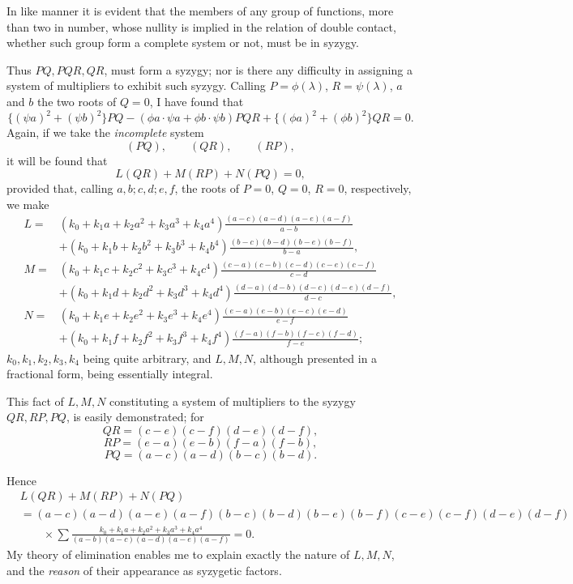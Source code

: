 \documentclass[11pt]{article}
\newcommand{\sourcepage}[1]{\marginpar{\scriptsize p.~#1}}
\begin{document}
{{In like manner it is evident that the members of any group of functions, more than two in number, whose nullity is implied in the relation of double contact, whether such group form a complete system or not, must be in syzygy.

Thus $PQ,PQR,QR$, must form a syzygy; nor is there any difficulty in assigning a system of multipliers to exhibit such syzygy. Calling $P=\phi(\lambda)$, $R=\psi(\lambda)$, $a$ and $b$ the two roots of $Q=0$, I have found that
\[
\{(\psi a)^2+(\psi b)^2\}PQ-(\phi a\cdot\psi a+\phi b\cdot\psi b)PQR+\{(\phi a)^2+(\phi b)^2\}QR=0.
\]
Again, if we take the \emph{incomplete} system
\[
(PQ),\qquad (QR),\qquad (RP),
\]
it will be found that
\[
L(QR)+M(RP)+N(PQ)=0,
\]
provided that, calling $a,b;c,d;e,f$, the roots of $P=0$, $Q=0$, $R=0$, respectively, we make
\[
\begin{aligned}
L={}&(k_0+k_1a+k_2a^2+k_3a^3+k_4a^4)
\frac{(a-c)(a-d)(a-e)(a-f)}{a-b}\\
&+(k_0+k_1b+k_2b^2+k_3b^3+k_4b^4)
\frac{(b-c)(b-d)(b-e)(b-f)}{b-a},\\
M={}&(k_0+k_1c+k_2c^2+k_3c^3+k_4c^4)
\frac{(c-a)(c-b)(c-d)(c-e)(c-f)}{c-d}\\
&+(k_0+k_1d+k_2d^2+k_3d^3+k_4d^4)
\frac{(d-a)(d-b)(d-c)(d-e)(d-f)}{d-c},\\
N={}&(k_0+k_1e+k_2e^2+k_3e^3+k_4e^4)
\frac{(e-a)(e-b)(e-c)(e-d)}{e-f}\\
&+(k_0+k_1f+k_2f^2+k_3f^3+k_4f^4)
\frac{(f-a)(f-b)(f-c)(f-d)}{f-e};
\end{aligned}
\]
$k_0,k_1,k_2,k_3,k_4$ being quite arbitrary, and $L,M,N$, although presented in a fractional form, being essentially integral.

This fact of $L,M,N$ constituting a system of multipliers to the syzygy $QR,RP,PQ$, is easily demonstrated; for
\[
QR=(c-e)(c-f)(d-e)(d-f),
\]
\[
RP=(e-a)(e-b)(f-a)(f-b),
\]
\[
PQ=(a-c)(a-d)(b-c)(b-d).
\]

\sourcepage{133}
Hence
\[
\begin{aligned}
&L(QR)+M(RP)+N(PQ)\\
&=(a-c)(a-d)(a-e)(a-f)(b-c)(b-d)(b-e)(b-f)(c-e)(c-f)(d-e)(d-f)\\
&\qquad{}\times
\sum \frac{k_0+k_1a+k_2a^2+k_3a^3+k_4a^4}
{(a-b)(a-c)(a-d)(a-e)(a-f)}=0.
\end{aligned}
\]
My theory of elimination enables me to explain exactly the nature of $L,M,N$, and the \emph{reason} of their appearance as syzygetic factors.

}}
\end{document}
